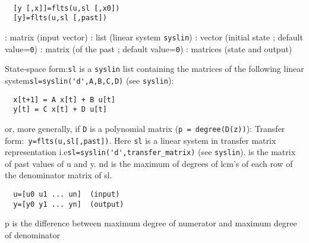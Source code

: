 \begin{mandesc}
   \\ %
\end{mandesc}
\begin{calling_sequence}
\begin{verbatim}
  [y [,x]]=flts(u,sl [,x0])  
  [y]=flts(u,sl [,past])    
\end{verbatim}
\end{calling_sequence}
\begin{parameters}
  \begin{varlist}
    : matrix (input vector)
    : list (linear system \verb!syslin!)
    : vector (initial state ; default value=\verb!0!)
    : matrix (of the past ; default value=\verb!0!)
    : matrices (state and output)
  \end{varlist}
\end{parameters}
\begin{mandescription}
  State-space form:\verb!sl! is a \verb!syslin! list containing the matrices of the 
  following linear system\verb!sl=syslin('d',A,B,C,D)! (see \verb!syslin!):
\begin{verbatim}
  x[t+1] = A x[t] + B u[t]
  y[t] = C x[t] + D u[t]
\end{verbatim}
or, more generally, if \verb!D! is a polynomial matrix (\verb!p = degree(D(z))!):
Transfer form:\verb! y=flts(u,sl[,past])!. Here \verb!sl! is a linear system in 
transfer matrix  representation i.e\verb!sl=syslin('d',transfer_matrix)! (see \verb!syslin!).
is the matrix of past values of u and y.
nd is the maximum of degrees of lcm's of each row of the denominator
matrix of sl.
\begin{verbatim}
  u=[u0 u1 ... un]  (input)
  y=[y0 y1 ... yn]  (output)
\end{verbatim}
p is the difference between maximum degree of numerator and 
maximum degree of denominator
\end{mandescription}
